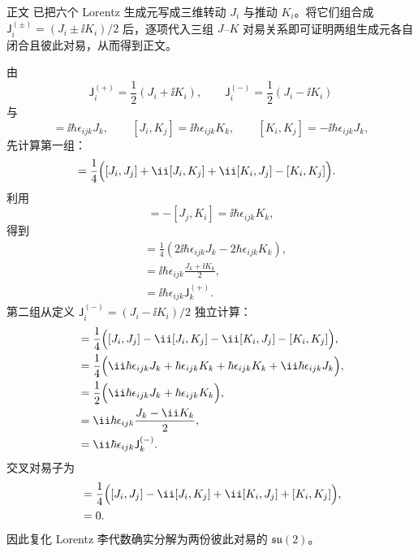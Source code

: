 \begin{derivation}

正文 已把六个 Lorentz 生成元写成三维转动 $J_i$ 与推动 $K_i$。将它们组合成 $\mathsf J_i^{(\pm)}=(J_i\pm\ii K_i)/2$ 后，逐项代入三组 $J$--$K$ 对易关系即可证明两组生成元各自闭合且彼此对易，从而得到正文。



由
\begin{equation*}
 \mathsf J_i^{(+)}=\frac12(J_i+\ii K_i),
 \qquad
 \mathsf J_i^{(-)}=\frac12(J_i-\ii K_i)
\end{equation*}
与
\begin{equation*}
 [J_i,J_j]=\ii\hbar\epsilon_{ijk}J_k,
 \qquad
 [J_i,K_j]=\ii\hbar\epsilon_{ijk}K_k,
 \qquad
 [K_i,K_j]=-\ii\hbar\epsilon_{ijk}J_k,
\end{equation*}
先计算第一组：
\begin{align*}
 [\mathsf J_i^{(+)},\mathsf J_j^{(+)}]
 &=\frac14\Bigl(
 [J_i,J_j]+\ii[J_i,K_j]
 +\ii[K_i,J_j]-[K_i,K_j]\Bigr).
\end{align*}
利用
\begin{equation*}
 [K_i,J_j]=-[J_j,K_i]
 =\ii\hbar\epsilon_{ijk}K_k,
\end{equation*}
得到
\begin{align*}
 [\mathsf J_i^{(+)},\mathsf J_j^{(+)}]
 &=\frac14\left(
 2\ii\hbar\epsilon_{ijk}J_k
 -2\hbar\epsilon_{ijk}K_k\right),\\
 &=\ii\hbar\epsilon_{ijk}
 \frac{J_k+\ii K_k}{2},\\
 &=\ii\hbar\epsilon_{ijk}\mathsf J_k^{(+)}.
\end{align*}
第二组从定义 $\mathsf J_i^{(-)}=(J_i-\ii K_i)/2$ 独立计算：
\begin{align*}
 [\mathsf J_i^{(-)},\mathsf J_j^{(-)}]
 &=\frac14\Bigl(
 [J_i,J_j]-\ii[J_i,K_j]
 -\ii[K_i,J_j]-[K_i,K_j]\Bigr),\\
 &=\frac14\Bigl(
 \ii\hbar\epsilon_{ijk}J_k
 +\hbar\epsilon_{ijk}K_k
 +\hbar\epsilon_{ijk}K_k
 +\ii\hbar\epsilon_{ijk}J_k\Bigr),\\
 &=\frac12\Bigl(
 \ii\hbar\epsilon_{ijk}J_k
 +\hbar\epsilon_{ijk}K_k\Bigr),\\
 &=\ii\hbar\epsilon_{ijk}\frac{J_k-\ii K_k}{2},\\
 &=\ii\hbar\epsilon_{ijk}\mathsf J_k^{(-)}.
\end{align*}
交叉对易子为
\begin{align*}
 [\mathsf J_i^{(+)},\mathsf J_j^{(-)}]
 &=\frac14\Bigl(
 [J_i,J_j]-\ii[J_i,K_j]
 +\ii[K_i,J_j]+[K_i,K_j]\Bigr),\\
 &=0.
\end{align*}
因此复化 Lorentz 李代数确实分解为两份彼此对易的 $\mathfrak{su}(2)$。
\end{derivation}

